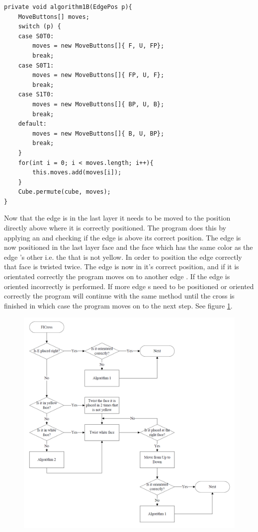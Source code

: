 \begin{lstlisting}[style=sourceCode, caption=\myCaption{This is algorithm 1B, which will move an edge piece from the middle layer to the top layer without ruining any edge pieces which are correctly positioned in the cross.}, label=src:middleMove, float=htb]
private void algorithm1B(EdgePos p){
	MoveButtons[] moves;
	switch (p) {
	case S0T0:
		moves = new MoveButtons[]{ F, U, FP};
		break;
	case S0T1:
		moves = new MoveButtons[]{ FP, U, F};
		break;
	case S1T0:
		moves = new MoveButtons[]{ BP, U, B};
		break;
	default:
		moves = new MoveButtons[]{ B, U, BP};
		break;
	}
	for(int i = 0; i < moves.length; i++){
		this.moves.add(moves[i]);
	}
	Cube.permute(cube, moves);
}
\end{lstlisting}

Now that the edge \cpiece{} is in the last layer it needs to be moved to the position directly above where it is correctly positioned. 
The program does this by applying an  \twist{} and checking if the edge \cpiece{} is above its correct position.
The edge \cpiece{} is now positioned in the last layer face and the face which has the same color as the edge  \cpiece{}'s other \facelet{} i.e. the \facelet{} that is not yellow.
In order to position the edge \cpiece{} correctly that face is twisted twice.
The edge \cpiece{} is now in it's correct position, and if it is orientated correctly the program moves on to another edge \cpiece{} .
If the edge \cpiece{} is oriented incorrectly  is performed. If more edge \cpiece{}s need to be positioned or oriented correctly the program will continue with the same method until the cross is finished in which case the program moves on to the next step. See figure \ref{fig:FlCrossFlow}.

\begin{figure}[htbp]
	\centering
		\includegraphics[width = \textwidth]{input/pics/FlCrossFlow3.png}
	\caption{}
	\label{fig:FlCrossFlow}
\end{figure}

